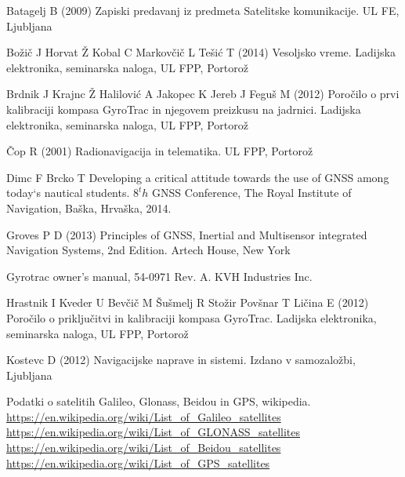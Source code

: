 %
%
%
% 
% 
%
\begin{thebibliography}{99.}
%
%
%
 Batagelj B (2009) Zapiski predavanj iz predmeta Satelitske komunikacije. UL FE, Ljubljana

 Božič J Horvat Ž Kobal C Markovčič L Tešić T (2014)  Vesoljsko vreme. Ladijska elektronika, seminarska naloga, UL FPP, Portorož %

 Brdnik J Krajnc Ž Halilović A Jakopec K Jereb J Feguš M (2012)  Poročilo o prvi kalibraciji kompasa GyroTrac in njegovem preizkusu na jadrnici. Ladijska elektronika, seminarska naloga, UL FPP, Portorož %

 Čop R (2001) Radionavigacija in telematika. UL FPP, Portorož %

 Dimc F Brcko T Developing a critical attitude towards the use of GNSS among today`s nautical students. $8^th$ GNSS Conference, The Royal Institute of Navigation, Baška, Hrvaška, 2014. %

 Groves P D (2013) Principles of GNSS, Inertial and Multisensor integrated Navigation Systems, 2nd Edition. Artech House, New York %

 Gyrotrac owner's manual, 54-0971 Rev. A. KVH Industries Inc.   %

 Hrastnik I Kveder U Bevčič M Šušmelj R Stožir Povšnar T Ličina E (2012)  Poročilo o priključitvi in kalibraciji kompasa GyroTrac. Ladijska elektronika, seminarska naloga, UL FPP, Portorož %

 Kostevc D (2012) Navigacijske naprave in sistemi. Izdano v samozaložbi, Ljubljana

 Podatki o satelitih Galileo, Glonass, Beidou in GPS, wikipedia. \\
 \url{https://en.wikipedia.org/wiki/List_of_Galileo_satellites} \\
 \url{https://en.wikipedia.org/wiki/List_of_GLONASS_satellites} \\
 \url{https://en.wikipedia.org/wiki/List_of_Beidou_satellites} \\  \url{https://en.wikipedia.org/wiki/List_of_GPS_satellites} 




\end{thebibliography}

